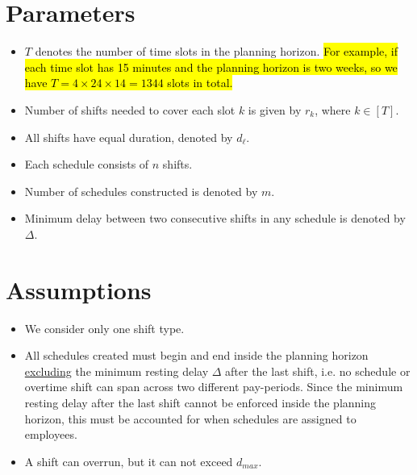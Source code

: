 \documentclass[11pt]{article}
\begin{document}
	 
	 

\section{Parameters}
\begin{itemize}
\item $T$ denotes the number of time slots in the planning horizon. \hl{For example, if each time slot has 15 minutes and the planning horizon is two weeks, so we have $T = 4\times 24 \times 14 = 1344$ slots in total.}

\item Number of shifts needed to cover each slot $k$ is given by $r_k$, where $k \in [T]$.

\item All shifts have equal duration, denoted by $d_\ell$.

\item Each schedule consists of $n$ shifts.

\item Number of schedules constructed is denoted by $m$.

\item Minimum delay between two consecutive shifts in any schedule is denoted by $\Delta$. 

\end{itemize}

\section{Assumptions} 
\begin{itemize}

\item We consider only one shift type.

\item All schedules created must begin and end inside the planning horizon \underline{excluding} the minimum resting delay $\Delta$ after the last shift, i.e. no schedule or overtime shift can span across two different pay-periods. Since the minimum resting delay after the last shift cannot be enforced inside the planning horizon, this must be accounted for when schedules are assigned to employees. 

\item A shift can overrun, but it can not exceed $d_{max}$.

\end{itemize}
\end{document}
